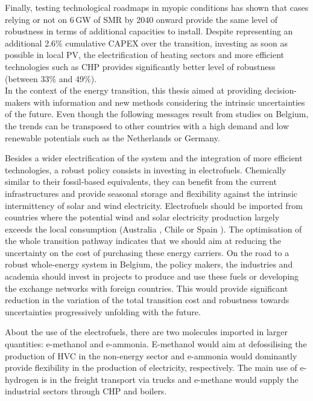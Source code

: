 Finally, testing technological roadmaps in myopic conditions has shown that cases relying or not on 6\,GW of \gls{SMR} by 2040 onward provide the same level of robustness in terms of additional capacities to install. Despite representing an additional 2.6\% cumulative CAPEX over the transition, investing as soon as possible in local \gls{PV}, the electrification of heating sectors and more efficient technologies such as \gls{CHP} provides significantly better level of robustness (between 33\% and 49\%).\\


In the context of the energy transition, this thesis aimed at providing decision-makers with information and new methods considering the intrinsic uncertainties of the future. Even though the following messages result from studies on Belgium, the trends can be transposed to other countries with a high demand and low renewable potentials such as the Netherlands or Germany. 

Besides a wider electrification of the system and the integration of more efficient technologies, a robust policy consists in investing in electrofuels. Chemically similar to their fossil-based equivalents, they can benefit from the current infrastructures and provide seasonal storage and flexibility against the intrinsic intermittency of solar and wind electricity. Electrofuels should be imported from countries where the potential wind and solar electricity production largely exceeds the local consumption (Australia \cite{Australia_efuels}, Chile \cite{Chile_efuels} or Spain \cite{Spain_efuels}). The optimisation of the whole transition pathway indicates that we should aim at reducing the uncertainty on the cost of purchasing these energy carriers. On the road to a robust whole-energy system in Belgium, the policy makers, the industries and academia should invest in projects to produce and use these fuels or developing the exchange networks with foreign countries. This would provide significant reduction in the variation of the total transition cost and robustness towards uncertainties progressively unfolding with the future. 

About the use of the electrofuels, there are two molecules imported in larger quantities: e-methanol and e-ammonia. E-methanol would aim at defossilising the production of \acrfull{HVC} in the non-energy sector and e-ammonia would dominantly provide flexibility in the production of electricity, respectively. The main use of e-hydrogen is in the freight transport via trucks and e-methane would supply the industrial sectors through \gls{CHP} and boilers.

